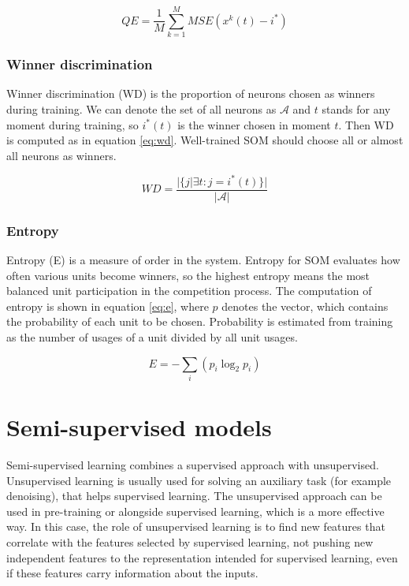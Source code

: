 \begin{equation}
	\label{eq:qe}
	QE = \frac{1}{M} \sum_{k=1}^M MSE(x^k(t) - i^*) %
\end{equation}

\subsubsection{Winner discrimination}
Winner discrimination (WD) is the proportion of neurons chosen as winners during training. We can denote the set of all neurons as $\mathcal{A}$ and $t$ stands for any moment during training, so $i^*(t)$ is the winner chosen in moment $t$. Then WD is computed as in equation \ref{eq:wd}. Well-trained SOM should choose all or almost all neurons as winners.

\begin{equation}
	\label{eq:wd}
	WD = \frac{|\{j | \exists t : j = i^*(t)\}|}{|\mathcal{A}|}
\end{equation}

\subsubsection{Entropy}
Entropy (E) is a measure of order in the system. Entropy for SOM evaluates how often various units become winners, so the highest entropy means the most balanced unit participation in the competition process. The computation of entropy is shown in equation \ref{eq:e}, where $p$ denotes the vector, which contains the probability of each unit to be chosen. Probability is estimated from training as the number of usages of a unit divided by all unit usages.

\begin{equation}
	\label{eq:e}
	E = - \sum_i (p_i  \log_2{p_i})
\end{equation}

\section{Semi-supervised models}

Semi-supervised learning combines a supervised approach with unsupervised. Unsupervised learning is usually used for solving an auxiliary task (for example denoising), that helps supervised learning. The unsupervised approach can be used in pre-training or alongside supervised learning, which is a more effective way. In this case, the role of unsupervised learning is to find new features that correlate with the features selected by supervised learning, not pushing new independent features to the representation intended for supervised learning, even if these features carry information about the inputs. \cite{valpola2015}

